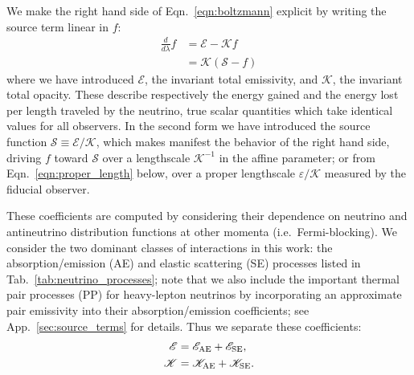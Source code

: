 \documentclass[aps,floatfix,prd,superscriptaddress,twocolumn]{revtex4-1}
\begin{document}
We make the right hand side of Eqn.~\ref{eqn:boltzmann} explicit by writing
the source term linear in $f$:
\begin{align}
  \label{eqn:boltzmann_linear}
  \frac{d}{d\lambda}f &=
  \mathscr{E} - \mathscr{K} f \\
  \label{eqn:boltzmann_linear_s}
  &= \mathscr{K}(\mathscr{S}-f)
\end{align}
where we have introduced
$\mathscr{E}$, the invariant total emissivity, and
$\mathscr{K}$, the invariant total opacity.
These describe respectively the energy gained and the energy lost
per length traveled by the neutrino, true scalar quantities
which take identical values for all observers.
In the second form we have introduced the source function
$\mathscr{S}\equiv\mathscr{E}/\mathscr{K}$, which makes manifest the
behavior of the right hand side, driving $f$ toward $\mathscr{S}$
over a lengthscale $\mathscr{K}^{-1}$ in the affine parameter;
or from Eqn.~\ref{eqn:proper_length} below, over a proper lengthscale
$\varepsilon/\mathscr{K}$ measured by the fiducial observer.

These coefficients are computed by considering their dependence
on neutrino and antineutrino distribution functions at other momenta
(i.e.\ Fermi-blocking).
We consider the two dominant classes of interactions in this work:
the absorption/emission (AE) and elastic scattering (SE) processes
listed in Tab.~\ref{tab:neutrino_processes};
note that we also include the important thermal pair processes (PP) for
heavy-lepton neutrinos by incorporating an approximate pair emissivity
into their absorption/emission coefficients;
see App.~\ref{sec:source_terms} for details.
Thus we separate these coefficients:
\begin{align}
  \label{eqn:inv_emissivity_components}
  \mathscr{E} &= \mathscr{E}_{\rm AE} + \mathscr{E}_{\rm SE},\\
  \label{eqn:inv_opacity_components}
  \mathscr{K} &= \mathscr{K}_{\rm AE} + \mathscr{K}_{\rm SE}.
\end{align}
\end{document}
